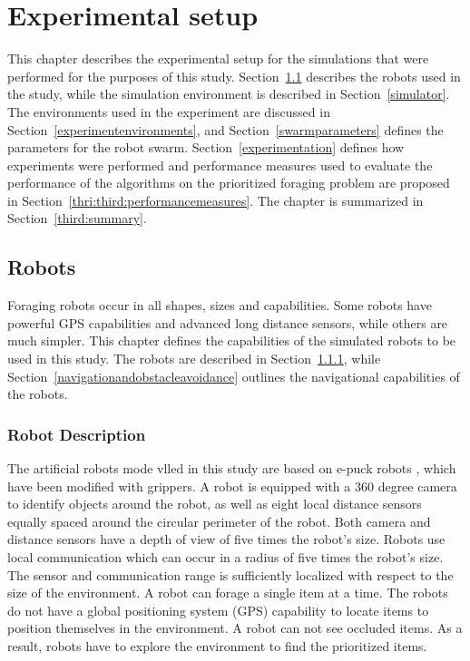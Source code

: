 
\chapter{Experimental setup}
\label{chap:experiment}


This chapter describes the experimental setup for the simulations that were performed for the purposes of this study. Section~\ref{chap:robots} describes the robots used in the study, while the simulation environment is described in Section~\ref{simulator}. The environments used in the experiment are discussed in Section~\ref{experimentenvironments}, and Section~\ref{swarmparameters} defines the parameters for the robot swarm. Section~\ref{experimentation} defines how experiments were performed and performance measures used to evaluate the performance of the algorithms on the prioritized foraging problem are proposed in Section~\ref{thri:third:performancemeasures}. The chapter is summarized in Section~\ref{third:summary}.


\section{Robots}
\label{chap:robots}

Foraging robots occur in all shapes, sizes and capabilities. Some robots have powerful GPS capabilities and advanced long distance sensors, while others are much simpler. This chapter defines the capabilities of the simulated robots to be used in this study. The robots are described in Section~\ref{robotdescription}, while Section~\ref{navigationandobstacleavoidance} outlines the navigational capabilities of the robots. 

\subsection{Robot Description}
\label{robotdescription}

The artificial robots mode vlled in this study are based on e-puck robots \cite{mondada2009puck}, which have been modified with grippers. A robot is equipped with a 360 degree camera to identify objects around the robot, as well as eight local distance sensors equally spaced around the circular perimeter of the robot. Both camera and distance sensors have a depth of view of five times the robot's size. Robots use local communication which can occur in a radius of five times the robot's size. The sensor and communication range is sufficiently localized with respect to the size of the environment. A robot can forage a single item at a time. The robots do not have a global positioning system (GPS) capability to locate items to position themselves in the environment. A robot can not see occluded items. As a result, robots have to explore the environment to find the prioritized items.

